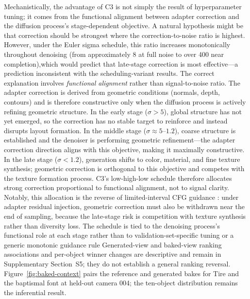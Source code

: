 \documentclass[times,twocolumn,final]{elsarticle}
\providecommand{\DIFadd}[1]{{\protect\color{blue} \sf #1}} %
\providecommand{\DIFdel}[1]{{\protect\color{red} \scriptsize #1}} %
\providecommand{\DIFaddbegin}{} %
\providecommand{\DIFaddend}{} %
\providecommand{\DIFdelend}{} %
\begin{document}
\DIFdel{Mechanistically, the advantage of C3 is not simply the result of hyperparameter tuning; it comes from the functional alignment between adapter correction and the diffusion process's stage-dependent objective. A natural hypothesis might be that correction should be strongest where the correction-to-noise ratio is highest. However, under the Euler sigma schedule, this ratio increases monotonically throughout denoising (from approximately 8 at full noise to over 400 near completion),which would predict that late-stage correction is most effective---a prediction inconsistent with the scheduling-variant results. The correct explanation involves \emph{functional alignment} rather than signal-to-noise ratio. The adapter correction is derived from geometric conditions (normals, depth, contours) and is therefore constructive only when the diffusion process is actively refining geometric structure. In the early stage ($\sigma > 5$), global structure has not yet emerged, so the correction has no stable target to reinforce and instead disrupts layout formation.
In the middle stage ($\sigma \approx 5$--$1.2$), coarse structure is established and the denoiser is performing geometric refinement---the adapter correction direction aligns with this objective, making it maximally constructive. In the late stage ($\sigma < 1.2$), generation shifts to color, material, and fine texture synthesis; geometric correction is orthogonal to this objective and competes with the texture formation process. C3's low-high-low schedule therefore allocates strong correction proportional to functional alignment, not to signal clarity. Notably, this allocation is the reverse of limited-interval CFG guidance \cite{kynkanniemi2024limited}: under adapter residual injection, geometric correction must also be withdrawn near the end of sampling, because the late-stage risk is competition with texture synthesis rather than diversity loss. The schedule is tied to the denoising process's functional role at each stage rather than to validation-set-specific tuning or a generic monotonic guidance rule}\DIFdelend \DIFaddbegin \DIFadd{Generated-view and baked-view ranking associations and per-object winner changes are descriptive and remain in Supplementary Section~S5; they do not establish a general ranking reversal. Figure~\ref{fig:baked-context} pairs the reference and generated bakes for Tire and the baptismal font at held-out camera 004; the ten-object distribution remains the inferential result}\DIFaddend .
\end{document}
